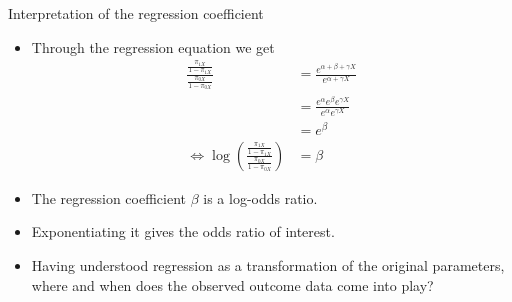 \documentclass[10pt]{beamer}\usepackage[]{graphicx}\usepackage[]{color}
\begin{document}
\begin{frame}{Interpretation of the regression coefficient}
	\begin{itemize}
		\item Through the regression equation we get
		$$
		\begin{aligned}
		\frac{\frac{\pi_{1 X}}{1-\pi_{1 X}}}{\frac{\pi_{0 X}}{1-\pi_{0 X}}} &=\frac{e^{\alpha+\beta+\gamma X}}{e^{\alpha+\gamma X}} \\
		&=\frac{e^{\alpha} e^{\beta} e^{\gamma X}}{e^{\alpha} e^{\gamma X}} \\
		&=e^{\beta} \\
		\Leftrightarrow \log \left(\frac{\frac{\pi_{1 X}}{1-\pi_{1 X}}}{\frac{\pi_{0 X}}{1-\pi_{0 X}}}\right) &=\beta
		\end{aligned}
		$$
		\item The regression coefficient $\beta$ is a log-odds ratio.
		\item Exponentiating it gives the odds ratio of interest.
		\item Having understood regression as a transformation of the original parameters, where and when does the observed outcome data come into play?
	\end{itemize}
\end{frame}
\end{document}
